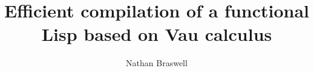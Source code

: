 \documentclass[acmsmall]{acmart}
\begin{document}
\title{Efficient compilation of a functional Lisp based on Vau calculus}

\author{Nathan Braswell}








\end{document}
